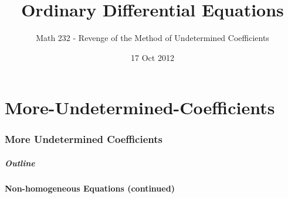 \part{More-Undetermined-Coefficients}
\section{More Undetermined Coefficients}

\title{Ordinary Differential Equations}
\subtitle{Math 232 - Revenge of the Method of Undetermined Coefficients}
\date{17 Oct 2012}

\begin{frame}
  \titlepage
\end{frame}

\begin{frame}
  \frametitle{Outline}
  \tableofcontents[ currentsection ]
\end{frame}


\subsection{Non-homogeneous Equations (continued)}


